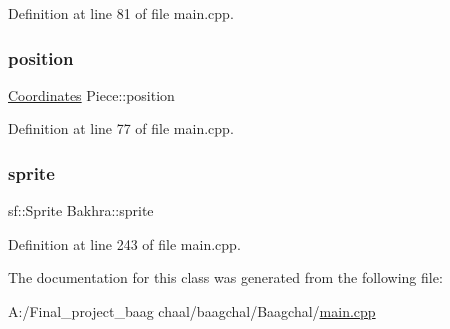 Definition at line 81 of file main.\+cpp.

\mbox{\label{class_piece_a3a789618e64cb8139a2bc79f44bb6edb}} 
\subsubsection{\texorpdfstring{position}{position}}
{\footnotesize\ttfamily \mbox{\hyperlink{class_coordinates}{Coordinates}} Piece\+::position\hspace{0.3cm}{\ttfamily [inherited]}}



Definition at line 77 of file main.\+cpp.

\mbox{\label{class_bakhra_a4dce75f87c5302ed0f9960e1596a0683}} 
\subsubsection{\texorpdfstring{sprite}{sprite}}
{\footnotesize\ttfamily sf\+::\+Sprite Bakhra\+::sprite\hspace{0.3cm}{\ttfamily [static]}}



Definition at line 243 of file main.\+cpp.



The documentation for this class was generated from the following file\+:\begin{DoxyCompactItemize}
\item 
A\+:/\+Final\+\_\+project\+\_\+baag chaal/baagchal/\+Baagchal/\mbox{\hyperlink{main_8cpp}{main.\+cpp}}\end{DoxyCompactItemize}

